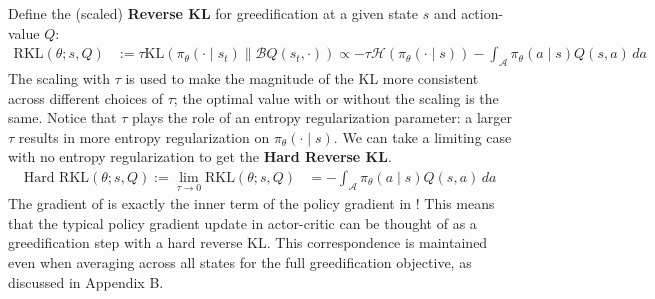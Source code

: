 \documentclass[twoside,11pt]{article}
\newcommand{\actionspace}{\mathcal{A}}
\newcommand{\Qhat}{{Q}}
\newcommand{\KL}{\mathrm{KL}}
\newcommand{\policyparams}{\theta}
\newcommand{\boltzmannQ}{\mathcal{B}Q}
\newcommand{\entropy}{\mathcal{H}}
\newcommand{\defeq}{:=}
\begin{document}
Define the (scaled) \textbf{Reverse KL} for greedification at a given state $s$ and action-value $\Qhat$:%
%
\begin{align*}
 \text{RKL}(\policyparams; s, \Qhat) &\defeq \tau\KL\left( \pi_\policyparams(\cdot \mid s_t) \parallel \boltzmannQ(s_t, \cdot) \right) \propto -\tau\entropy(\pi_\policyparams(\cdot \mid s)) - \int_\actionspace  \pi_\policyparams(a \mid s) {Q(s, a)}\, da 
\end{align*}
%
The scaling with $\tau$ is used to make the magnitude of the KL more consistent across different choices of $\tau$; the optimal value with or without the scaling is the same. 
Notice that $\tau$ plays the role of an entropy regularization parameter: a larger $\tau$ results in more entropy regularization on $\pi_\policyparams(\cdot \mid s)$.
We can take a limiting case with no entropy regularization to get the \textbf{Hard Reverse KL}.
%
\begin{align}\label{eq:hard-reverse-KL}
    \text{Hard RKL}(\policyparams; s, \Qhat) \defeq \lim_{\tau \to 0} \text{RKL}(\policyparams; s, \Qhat) &= -\int_\actionspace \pi_\theta(a \mid s) Q(s, a)\, da
\end{align}
The gradient of  is exactly the inner term of the policy gradient in ! 
This means that the typical policy gradient update in actor-critic can be thought of as a greedification step with a hard reverse KL. This correspondence is maintained even when averaging across all states for the full greedification objective, as discussed in Appendix B.
\end{document}
